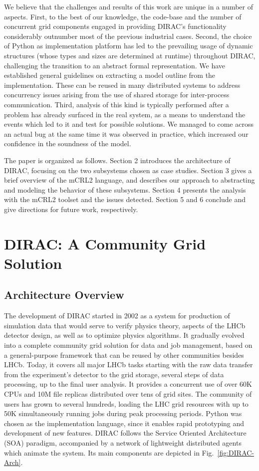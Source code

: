 \documentclass[sort&compress,preprint,3p]{elsarticle}
\begin{document}
We believe that the challenges and results of this work are unique in
a number of aspects. First, to the best of our knowledge, the code-base
and the number of concurrent grid components engaged in providing DIRAC's
functionality considerably outnumber most of the previous industrial cases. Second,
the choice of Python as implementation platform has led to the prevailing
usage of dynamic structures (whose types and sizes are determined at
runtime) throughout DIRAC, challenging the transition to an abstract
formal representation. We have established general
guidelines on extracting a model outline from the implementation. These
can be reused in many distributed systems to address concurrency issues arising 
from the use of shared storage for inter-process communication. Third,
analysis of this kind is typically performed after a problem has already
surfaced in the real system, as a means to understand the events which
led to it and test for possible solutions. We managed to come across an
actual bug at the same time it was observed in practice, which increased
our confidence in the soundness of the model.

The paper is organized as follows. Section 2 introduces the architecture
of DIRAC, focusing on the two subsystems chosen as case studies. Section 3 gives a brief
overview of the mCRL2 language, and describes our approach to abstracting
and modeling the behavior of these subsystems. Section 4 presents the
analysis with the mCRL2 toolset and the issues detected. Section 5 and 6
conclude and give directions for future work, respectively. 

\section{DIRAC: A Community Grid Solution}
\label{sec:Section_2}
\subsection{Architecture Overview}

The development of DIRAC started in 2002 as a system for production of simulation
data that would serve to verify physics theory, aspects of the LHCb detector design, as
well as to optimize physics algorithms. It gradually evolved into a complete community
grid solution for data and job management, based on a general-purpose framework
that can be reused by other communities besides LHCb. Today, it covers all major
LHCb tasks starting with the raw data transfer from the experiment's detector to
the grid storage, several steps of data processing, up to the final user
analysis. 
It provides a concurrent use of over 60K CPUs and 10M file replicas distributed over
tens of grid sites. The community of users has grown to several hundreds, loading the 
LHC grid resources with up to 50K simultaneously running jobs during peak processing periods.
Python was chosen as the implementation language, since it enables
rapid prototyping and development of new features. DIRAC follows the Service
Oriented Architecture (SOA) paradigm, accompanied by a network of lightweight
distributed agents which animate the system. Its main components are depicted in
Fig.~\ref{fig:DIRAC-Arch}. 
\end{document}
